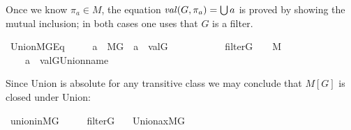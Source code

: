 Once we know $\pi_a \in M$, the equation $\operatorname{\mathit{val}}(G,\pi_a)=\mathop{\textstyle\bigcup} a$ is
proved by showing the mutual inclusion; in both cases one uses that
$G$ is a filter.
\begin{isabelle}
  \isamarkupfalse%
\ Union{\isacharunderscore}MG{\isacharunderscore}Eq\ {\isacharcolon}\ \isanewline
\ \ \ {\isachardoublequoteopen}a\ {\isasymin}\ M{\isacharbrackleft}G{\isacharbrackright}{\isachardoublequoteclose}\ \ {\isachardoublequoteopen}a\ {\isacharequal}\ val{\isacharparenleft}G{\isacharcomma}{\isasymtau}{\isacharparenright}{\isachardoublequoteclose}\ \isanewline
\ \ \ \ \ \ \ \ \ \ {\isachardoublequoteopen}filter{\isacharparenleft}G{\isacharparenright}{\isachardoublequoteclose}\ \ {\isachardoublequoteopen}{\isasymtau}\ {\isasymin}\ M{\isachardoublequoteclose}\isanewline
\ \ \ {\isachardoublequoteopen}{\isasymUnion}\ a\ {\isacharequal}\ val{\isacharparenleft}G{\isacharcomma}Union{\isacharunderscore}name{\isacharparenleft}{\isasymtau}{\isacharparenright}{\isacharparenright}{\isachardoublequoteclose}
\end{isabelle}
Since Union is absolute for any transitive class we may conclude that
$M[G]$ is closed under Union:
\begin{isabelle}
  \isamarkupfalse%
  \ union{\isacharunderscore}in{\isacharunderscore}MG\ {\isacharcolon}\ \isanewline
  \ \ \ {\isachardoublequoteopen}filter{\isacharparenleft}G{\isacharparenright}{\isachardoublequoteclose}\isanewline
\ \ \ {\isachardoublequoteopen}Union{\isacharunderscore}ax{\isacharparenleft}{\isacharhash}{\isacharhash}M{\isacharbrackleft}G{\isacharbrackright}{\isacharparenright}{\isachardoublequoteclose}
\end{isabelle}

